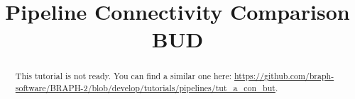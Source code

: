 \documentclass[justified]{tufte-handout}
\title{Pipeline Connectivity Comparison BUD}
\begin{document}
\maketitle

\begin{abstract}
\noindent
This tutorial is not ready. You can find a similar one here: \url{https://github.com/braph-software/BRAPH-2/blob/develop/tutorials/pipelines/tut_a_con_but}.
\end{abstract}
\end{document}
